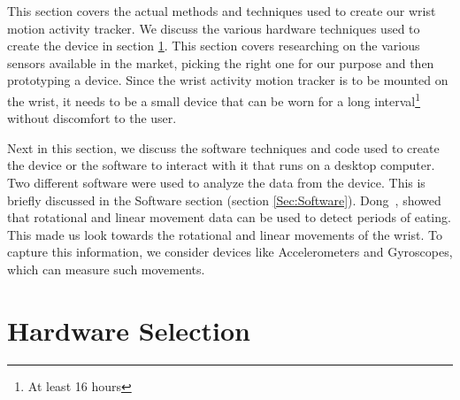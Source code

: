 This section covers the actual methods and techniques used to create our wrist 
motion activity tracker. We discuss the various hardware techniques used to 
create the device in section \ref{Sec:Hardware}.
This section covers researching on the various sensors available in the market,
picking the right one for our purpose and then prototyping a device.
Since the wrist activity motion tracker is to be mounted on the wrist, it needs
to be a small device that can be worn for a long interval\footnote{At least
16 hours} without discomfort to the user.%

Next in this section, we discuss the software techniques and code
used to create the device or the software to interact with it that runs on a desktop computer.
Two different software were used to analyze the data from the device.
This is briefly discussed in the Software section (section \ref{Sec:Software}).
Dong~\cite{dong2013detecting}, showed that rotational and linear movement data can be used to detect
periods of eating. This made us look towards the rotational and linear movements of the wrist.
To capture this information, we consider devices like Accelerometers and Gyroscopes, which can measure such movements.

\section{Hardware Selection}
\label{Sec:Hardware}